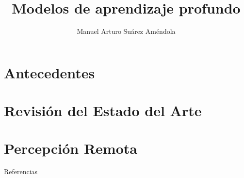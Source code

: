\documentclass[11pt]{beamer}
\title[Seminario de UAM]
{Modelos de aprendizaje profundo}
\author[Suárez, M.A.]{Manuel Arturo Suárez Améndola}
\begin{document}


\section{Antecedentes}


\section{Revisión del Estado del Arte}


\section{Percepción Remota}


\nocite{*}
\begin{frame}[allowframebreaks]{Referencias}


\end{frame}
\end{document}
